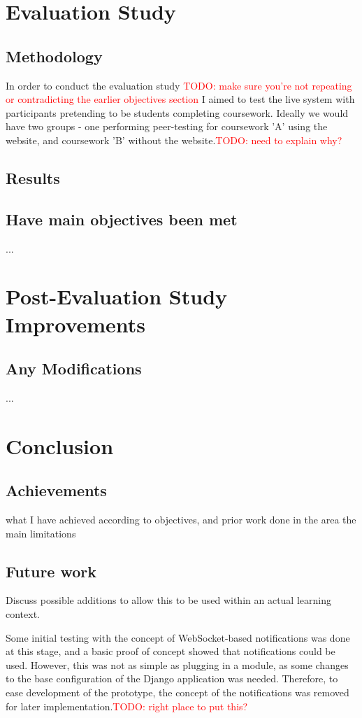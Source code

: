 \documentclass[a4paper,11pt]{report}
\newcommand{\todo}[1]{\textcolor{red}{TODO: #1}}
\begin{document}
\chapter{Evaluation Study}
\section{Methodology}
In order to conduct the evaluation study \todo{make sure you're not repeating or contradicting the earlier objectives section} I aimed to test the live system with participants pretending to be students completing coursework. Ideally we would have two groups - one performing peer-testing for coursework 'A' using the website, and coursework 'B' without the website.\todo{need to explain why?}
\section{Results}
\section{Have main objectives been met}
...

\chapter{Post-Evaluation Study Improvements}
\section{Any Modifications}
...


\chapter{Conclusion}
\section{Achievements}
what I have achieved according to objectives, and prior work done in the area
the main limitations
\section{Future work}
Discuss possible additions to allow this to be used within an actual learning context.\par
Some initial testing with the concept of WebSocket-based notifications was done at this stage, and a basic proof of concept showed that notifications could be used. However, this was not as simple as plugging in a module, as some changes to the base configuration of the Django application was needed. Therefore, to ease development of the prototype, the concept of the notifications was removed for later implementation.\todo{right place to put this?}\par
\end{document}
